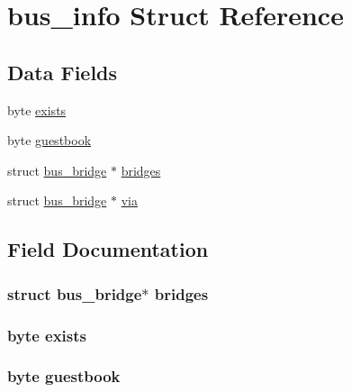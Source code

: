 \hypertarget{structbus__info}{}\section{bus\+\_\+info Struct Reference}
\label{structbus__info}
\subsection*{Data Fields}
\begin{DoxyCompactItemize}
\item 
byte \hyperlink{structbus__info_ac646dea24817e5d94432f227d1586d77}{exists}
\item 
byte \hyperlink{structbus__info_ac8e291afefaabb214a44345049996333}{guestbook}
\item 
struct \hyperlink{structbus__bridge}{bus\+\_\+bridge} $\ast$ \hyperlink{structbus__info_ad18ad98237e15c1b0feb1ecacc00e781}{bridges}
\item 
struct \hyperlink{structbus__bridge}{bus\+\_\+bridge} $\ast$ \hyperlink{structbus__info_a59d40f986c045013a79ee249a987219b}{via}
\end{DoxyCompactItemize}


\subsection{Field Documentation}
\subsubsection[{\texorpdfstring{bridges}{bridges}}]{\setlength{\rightskip}{0pt plus 5cm}struct {\bf bus\+\_\+bridge}$\ast$ bridges}\hypertarget{structbus__info_ad18ad98237e15c1b0feb1ecacc00e781}{}\label{structbus__info_ad18ad98237e15c1b0feb1ecacc00e781}
\subsubsection[{\texorpdfstring{exists}{exists}}]{\setlength{\rightskip}{0pt plus 5cm}byte exists}\hypertarget{structbus__info_ac646dea24817e5d94432f227d1586d77}{}\label{structbus__info_ac646dea24817e5d94432f227d1586d77}
\subsubsection[{\texorpdfstring{guestbook}{guestbook}}]{\setlength{\rightskip}{0pt plus 5cm}byte guestbook}\hypertarget{structbus__info_ac8e291afefaabb214a44345049996333}{}\label{structbus__info_ac8e291afefaabb214a44345049996333}
